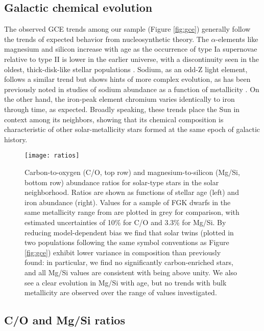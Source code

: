 \documentclass[twocolumn]{aastex62}
\newcommand{\acronym}[1]{{\small{#1}}}
\begin{document}
\subsection{Galactic chemical evolution}

The observed \acronym{GCE} trends among our sample (Figure \ref{fig:gce}) generally follow the trends of expected behavior from nucleosynthetic theory. 
The $\alpha$-elements like magnesium and silicon increase with age as the occurrence of type Ia supernovae relative to type II is lower in the earlier universe, with a discontinuity seen in the oldest, thick-disk-like stellar populations \citep{gilmore89}. 
Sodium, as an odd-Z light element, follows a similar trend but shows hints of more complex evolution, as has been previously noted in studies of sodium abundance as a function of metallicity \citep{bensby17}. 
On the other hand, the iron-peak element chromium varies identically to iron through time, as expected. 
Broadly speaking, these trends place the Sun in context among its neighbors, showing that its chemical composition is characteristic of other solar-metallicity stars formed at the same epoch of galactic history.

\begin{figure}
\centering
\texttt{[image: ratios]}
\caption{Carbon-to-oxygen (C/O, top row) and magnesium-to-silicon (Mg/Si, bottom row) abundance ratios for solar-type stars in the solar neighborhood. Ratios are shown as functions of stellar age (left) and iron abundance (right). Values for a sample of FGK dwarfs in the same metallicity range from \citet{brewer16} are plotted in grey for comparison, with estimated uncertainties of 10\% for C/O and 3.3\% for Mg/Si. By reducing model-dependent bias we find that solar twins (plotted in two populations following the same symbol conventions as Figure \ref{fig:gce}) exhibit lower variance in composition than previously found: in particular, we find no significantly carbon-enriched stars, and all Mg/Si values are consistent with being above unity. We also see a clear evolution in Mg/Si with age, but no trends with bulk metallicity are observed over the range of values investigated.}
\label{fig:ratios}
\end{figure}

\subsection{C/O and Mg/Si ratios}
\end{document}
